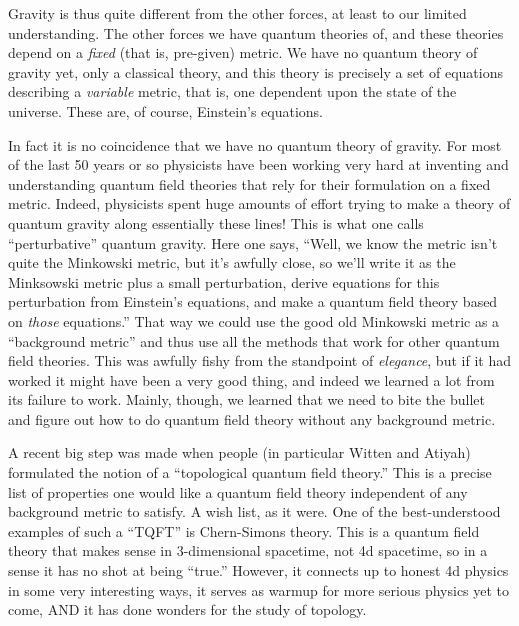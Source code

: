 \documentclass{article}
\begin{document}
Gravity is thus quite different from the other forces, at least to our
limited understanding. The other forces we have quantum theories of, and
these theories depend on a \emph{fixed} (that is, pre-given) metric. We
have no quantum theory of gravity yet, only a classical theory, and this
theory is precisely a set of equations describing a \emph{variable}
metric, that is, one dependent upon the state of the universe. These
are, of course, Einstein's equations.

In fact it is no coincidence that we have no quantum theory of gravity.
For most of the last 50 years or so physicists have been working very
hard at inventing and understanding quantum field theories that rely for
their formulation on a fixed metric. Indeed, physicists spent huge
amounts of effort trying to make a theory of quantum gravity along
essentially these lines! This is what one calls ``perturbative'' quantum
gravity. Here one says, ``Well, we know the metric isn't quite the
Minkowski metric, but it's awfully close, so we'll write it as the
Minksowski metric plus a small perturbation, derive equations for this
perturbation from Einstein's equations, and make a quantum field theory
based on \emph{those} equations.'' That way we could use the good old
Minkowski metric as a ``background metric'' and thus use all the methods
that work for other quantum field theories. This was awfully fishy from
the standpoint of \emph{elegance}, but if it had worked it might have
been a very good thing, and indeed we learned a lot from its failure to
work. Mainly, though, we learned that we need to bite the bullet and
figure out how to do quantum field theory without any background metric.

A recent big step was made when people (in particular Witten and Atiyah)
formulated the notion of a ``topological quantum field theory.'' This is
a precise list of properties one would like a quantum field theory
independent of any background metric to satisfy. A wish list, as it
were. One of the best-understood examples of such a ``TQFT'' is
Chern-Simons theory. This is a quantum field theory that makes sense in
3-dimensional spacetime, not 4d spacetime, so in a sense it has no shot
at being ``true.'' However, it connects up to honest 4d physics in some
very interesting ways, it serves as warmup for more serious physics yet
to come, AND it has done wonders for the study of topology.
\end{document}
